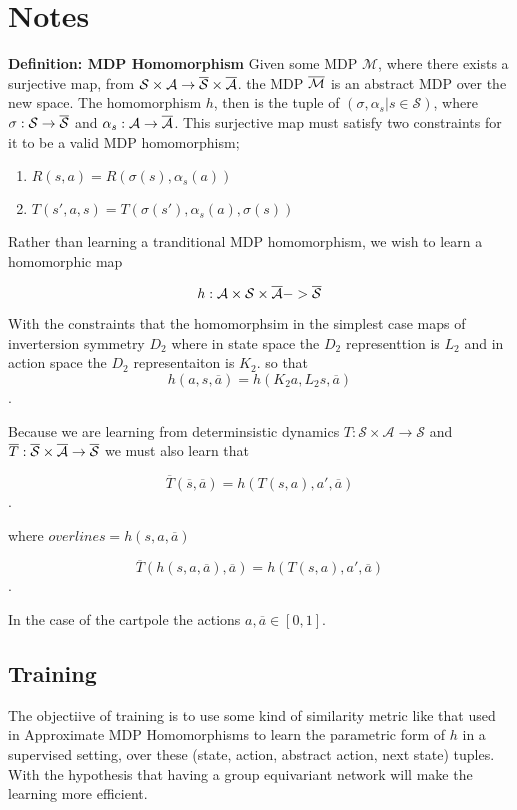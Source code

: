 \section{Notes}

\textbf{Definition: MDP Homomorphism} Given some MDP $\mathcal{M}$, where there
exists a surjective map, from $\mathcal{S} \times \mathcal{A} \rightarrow \overline{\mathcal{S}} \times
	\overline{\mathcal{A}}$. the MDP $\overline{\mathcal{M}}$ is an abstract MDP over the new space. The
homomorphism $h$, then is the tuple of $(\sigma, \alpha_s|s \in \mathcal{S})$, where
$\sigma: \mathcal{S} \rightarrow \overline{\mathcal{S}}$ and $\alpha_s : \mathcal{A} \rightarrow \overline{\mathcal{A}}$.
This surjective map must satisfy two constraints for it to be a valid MDP
homomorphism; \begin{enumerate} \item $R(s, a) = R(\sigma(s), \alpha_s(a))$
	\item $T(s', a, s) = T(\sigma(s'), \alpha_s(a), \sigma(s))$ \end{enumerate}


Rather than learning a tranditional MDP homomorphism, we wish to learn a homomorphic map

$$h: \mathcal{A} \times \mathcal{S} \times \overline{\mathcal{A}} -> \overline{\mathcal{S}}$$

With the constraints that the homomorphsim in the simplest case maps of invertersion symmetry $D_2$ where in state space the $D_2$ representtion is $L_2$ and in action space the $D_2$ representaiton is $K_2$. so that $$h(a, s, \overline{a}) = h(K_2 a, L_2 s, \overline{a})$$.

Because we are learning from determinsistic dynamics $T: \mathcal{S} \times \mathcal{A} \rightarrow \mathcal{S}$ and $\overline{T}: \overline{\mathcal{S}} \times \overline{\mathcal{A}} \rightarrow \overline{\mathcal{S}}$ we must also learn that

$$\overline{T}(\overline{s}, \overline{a}) = h(T(s, a), a', \overline{a})$$.

where $overline{s} = h(s, a, \overline{a})$

$$\overline{T}(h(s, a, \overline{a}), \overline{a}) = h(T(s, a), a', \overline{a})$$.


In the case of the cartpole the actions $a, \overline{a} \in [0, 1]$.


\subsection{Training}
The objectiive of training is to use some kind of similarity metric like that used in Approximate MDP Homomorphisms to learn the parametric form of $h$ in a supervised setting, over these (state, action, abstract action, next state) tuples.
With the hypothesis that having a group equivariant network will make the learning more efficient.
